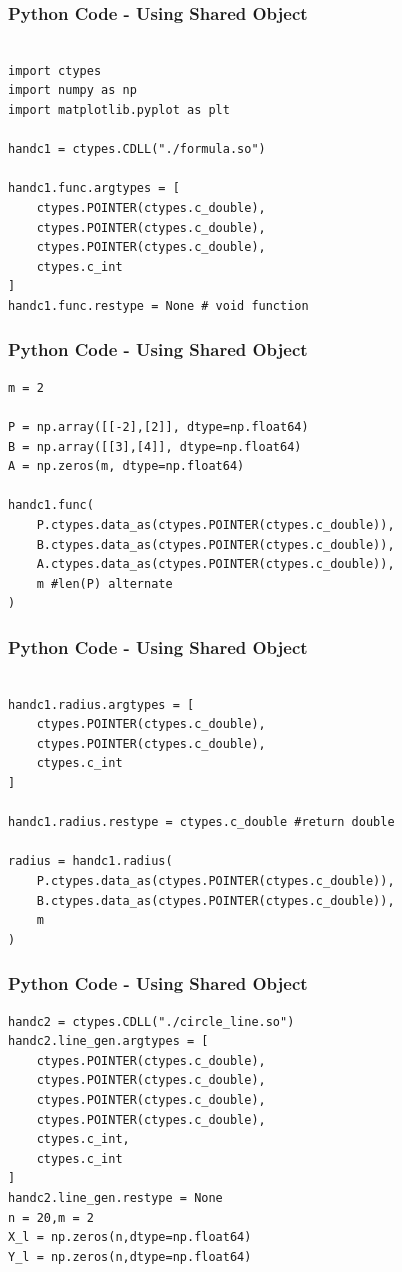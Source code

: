 \documentclass{beamer}
\begin{document}
\begin{frame}[fragile]
    \frametitle{Python Code - Using Shared Object}
    \begin{lstlisting}

import ctypes
import numpy as np
import matplotlib.pyplot as plt

handc1 = ctypes.CDLL("./formula.so")

handc1.func.argtypes = [
    ctypes.POINTER(ctypes.c_double),
    ctypes.POINTER(ctypes.c_double),
    ctypes.POINTER(ctypes.c_double),
    ctypes.c_int
]
handc1.func.restype = None # void function
\end{lstlisting}
\end{frame}

\begin{frame}[fragile]
    \frametitle{Python Code - Using Shared Object}
    \begin{lstlisting}
m = 2

P = np.array([[-2],[2]], dtype=np.float64)
B = np.array([[3],[4]], dtype=np.float64)
A = np.zeros(m, dtype=np.float64)

handc1.func(
    P.ctypes.data_as(ctypes.POINTER(ctypes.c_double)),
    B.ctypes.data_as(ctypes.POINTER(ctypes.c_double)),
    A.ctypes.data_as(ctypes.POINTER(ctypes.c_double)),
    m #len(P) alternate
)
\end{lstlisting}
\end{frame}

\begin{frame}[fragile]
    \frametitle{Python Code - Using Shared Object}
    \begin{lstlisting}

handc1.radius.argtypes = [
    ctypes.POINTER(ctypes.c_double),
    ctypes.POINTER(ctypes.c_double),
    ctypes.c_int
]

handc1.radius.restype = ctypes.c_double #return double

radius = handc1.radius(
    P.ctypes.data_as(ctypes.POINTER(ctypes.c_double)),
    B.ctypes.data_as(ctypes.POINTER(ctypes.c_double)),
    m
)
\end{lstlisting}
\end{frame}

\begin{frame}[fragile]
    \frametitle{Python Code - Using Shared Object}
    \begin{lstlisting}
handc2 = ctypes.CDLL("./circle_line.so")
handc2.line_gen.argtypes = [
    ctypes.POINTER(ctypes.c_double),
    ctypes.POINTER(ctypes.c_double),
    ctypes.POINTER(ctypes.c_double),
    ctypes.POINTER(ctypes.c_double),
    ctypes.c_int,
    ctypes.c_int
]
handc2.line_gen.restype = None
n = 20,m = 2
X_l = np.zeros(n,dtype=np.float64)
Y_l = np.zeros(n,dtype=np.float64)
\end{lstlisting}
\end{frame}
\end{document}
